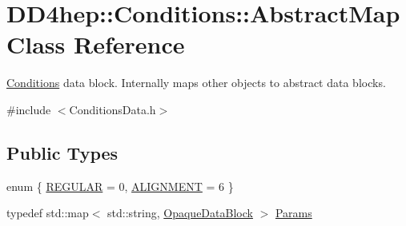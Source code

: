 \hypertarget{class_d_d4hep_1_1_conditions_1_1_abstract_map}{}\section{D\+D4hep\+:\+:Conditions\+:\+:Abstract\+Map Class Reference}
\label{class_d_d4hep_1_1_conditions_1_1_abstract_map}


\hyperlink{namespace_d_d4hep_1_1_conditions}{Conditions} data block. Internally maps other objects to abstract data blocks.  




{\ttfamily \#include $<$Conditions\+Data.\+h$>$}

\subsection*{Public Types}
\begin{DoxyCompactItemize}
\item 
enum \{ \hyperlink{class_d_d4hep_1_1_conditions_1_1_abstract_map_a77a7651d9ea83e8c83ded9eb6765d532a00ddc93e8ea953666d5b3560926184e7}{R\+E\+G\+U\+L\+AR} = 0, 
\hyperlink{class_d_d4hep_1_1_conditions_1_1_abstract_map_a77a7651d9ea83e8c83ded9eb6765d532a79b94c3c134968d52e05163d53c5b7cc}{A\+L\+I\+G\+N\+M\+E\+NT} = 6
 \}
\item 
typedef std\+::map$<$ std\+::string, \hyperlink{class_d_d4hep_1_1_opaque_data_block}{Opaque\+Data\+Block} $>$ \hyperlink{class_d_d4hep_1_1_conditions_1_1_abstract_map_a0a7595cac22aa8ddc6f6900d7883c2fc}{Params}
\end{DoxyCompactItemize}
